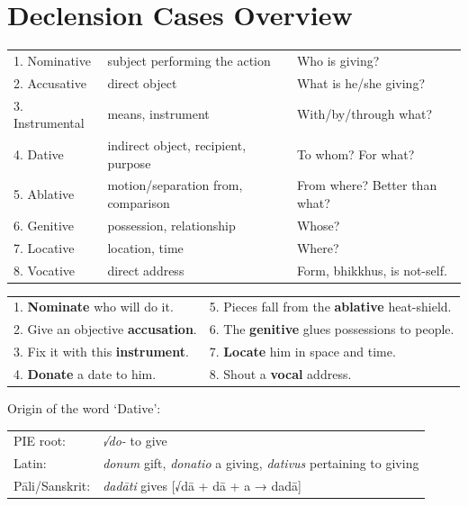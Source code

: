 \documentclass[11pt,oneside]{memoir}
\begin{document}
\normalArrayStretch

\clearpage
\section{Declension Cases Overview}
\label{sec:orgddc0f1c}

\begin{tabular}{lll}
1. Nominative & subject performing the action & Who is giving?\\
2. Accusative & direct object & What is he/she giving?\\
3. Instrumental & means, instrument & With/by/through what?\\
4. Dative & indirect object, recipient, purpose & To whom? For what?\\
5. Ablative & motion/separation from, comparison & From where? Better than what?\\
6. Genitive & possession, relationship & Whose?\\
7. Locative & location, time & Where?\\
8. Vocative & direct address & Form, bhikkhus, is not-self.\\
\end{tabular}


\begin{center}
\begin{tabular}{ll}
1. \textbf{Nominate} who will do it. & 5. Pieces fall from the \textbf{ablative} heat-shield.\\
2. Give an objective \textbf{accusation}. & 6. The \textbf{genitive} glues possessions to people.\\
3. Fix it with this \textbf{instrument}. & 7. \textbf{Locate} him in space and time.\\
4. \textbf{Donate} a date to him. & 8. Shout a \textbf{vocal} address.\\
\end{tabular}
\end{center}

Origin of the word `Dative':

\begin{center}
\begin{tabular}{ll}
PIE root: & \emph{√do-} to give\\
Latin: & \emph{donum} gift, \emph{donatio} a giving, \emph{dativus} pertaining to giving\\
Pāli/Sanskrit: & \emph{dadāti} gives [√dā + dā + a → dadā]\\
\end{tabular}
\end{center}
\end{document}
